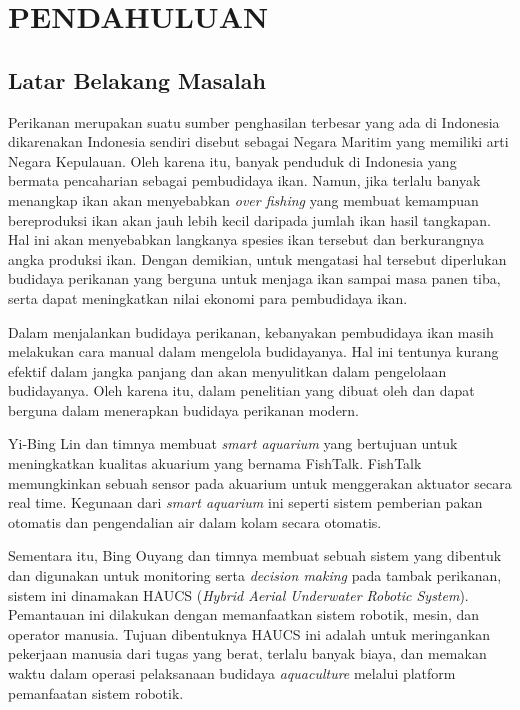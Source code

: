 
\chapter{PENDAHULUAN}

\section{Latar Belakang Masalah}

Perikanan merupakan suatu sumber penghasilan terbesar yang ada di Indonesia dikarenakan Indonesia sendiri disebut sebagai Negara Maritim yang memiliki arti Negara Kepulauan. Oleh karena itu, banyak penduduk di Indonesia yang bermata pencaharian sebagai pembudidaya ikan. Namun, jika terlalu banyak menangkap ikan akan menyebabkan \textit{over fishing} yang membuat kemampuan bereproduksi ikan akan jauh lebih kecil daripada jumlah ikan hasil tangkapan. Hal ini akan menyebabkan langkanya spesies ikan tersebut dan berkurangnya angka produksi ikan. Dengan demikian, untuk mengatasi hal tersebut diperlukan budidaya perikanan yang berguna untuk menjaga ikan sampai masa panen tiba, serta dapat meningkatkan nilai ekonomi para pembudidaya ikan.

Dalam menjalankan budidaya perikanan, kebanyakan pembudidaya ikan masih melakukan cara manual dalam mengelola budidayanya. Hal ini tentunya kurang efektif dalam jangka panjang dan akan menyulitkan dalam pengelolaan budidayanya. Oleh karena itu, dalam penelitian yang dibuat oleh \citep{fishtalk} dan \citep{haucs} dapat berguna dalam menerapkan budidaya perikanan modern.

Yi-Bing Lin dan timnya membuat \textit{smart aquarium} yang bertujuan untuk meningkatkan kualitas akuarium yang bernama FishTalk. FishTalk memungkinkan sebuah sensor pada akuarium untuk menggerakan aktuator secara real time. Kegunaan dari \textit{smart aquarium} ini seperti sistem pemberian pakan otomatis dan pengendalian air dalam kolam secara otomatis. \citep{fishtalk}

Sementara itu, Bing Ouyang dan timnya membuat sebuah sistem yang dibentuk dan digunakan untuk monitoring serta \textit{decision making} pada tambak perikanan, sistem ini dinamakan HAUCS (\textit{Hybrid Aerial Underwater Robotic System}). Pemantauan ini dilakukan dengan memanfaatkan sistem robotik, mesin, dan operator manusia. Tujuan dibentuknya HAUCS ini adalah untuk meringankan pekerjaan manusia dari tugas yang berat, terlalu banyak biaya, dan memakan waktu dalam operasi pelaksanaan budidaya \textit{aquaculture} melalui platform pemanfaatan sistem robotik. \citep{haucs}

